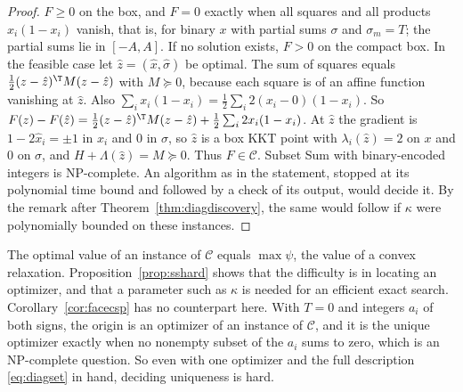 \begin{proof}
$F\ge0$ on the box, and $F=0$ exactly when all squares and all products
$x_i(1-x_i)$ vanish, that is, for binary $x$ with partial sums $\sigma$ and
$\sigma_m=T$; the partial sums lie in $[-A,A]$. If no solution exists, $F>0$
on the compact box. In the feasible case let $\hat z=(\hat x,\hat\sigma)$ be
optimal. The sum of
squares equals $\frac12(z-\hat z)^{\T}M(z-\hat z)$ with $M\succeq0$,
because each square is of an affine function vanishing at $\hat z$. Also
$\sum_ix_i(1-x_i)=\frac12\sum_i2(x_i-0)(1-x_i)$. So
$F(z)-F(\hat z)=\frac12(z-\hat z)^{\T}M(z-\hat z)+\frac12\sum_i2x_i(1-x_i)$.
At $\hat z$ the gradient is $1-2\hat x_i=\pm1$ in $x_i$ and $0$ in
$\sigma$, so $\hat z$ is a box KKT point with $\lambda_i(\hat z)=2$ on $x$ and
$0$ on $\sigma$, and $H+\Lambda(\hat z)=M\succeq0$. Thus $F\in\mathcal C$.
Subset Sum with binary-encoded integers is NP-complete. An algorithm as in the
statement, stopped at its polynomial time bound and followed by a check of its
output, would decide it. By the remark after Theorem~\ref{thm:diagdiscovery},
the same would follow if $\kappa$ were polynomially bounded on these instances.
\end{proof}

The optimal value of an instance of $\mathcal C$ equals $\max\psi$, the value
of a convex relaxation. Proposition~\ref{prop:sshard} shows that the
difficulty is in locating an optimizer, and that a parameter such as $\kappa$
is needed for an efficient exact search. Corollary~\ref{cor:facecsp} has no
counterpart here. With $T=0$ and integers $a_i$ of both signs, the origin is an
optimizer of an instance of $\mathcal C$, and it is the unique optimizer
exactly when no nonempty subset of the $a_i$ sums to zero, which is an
NP-complete question. So even with one optimizer and the full description
\eqref{eq:diagset} in hand, deciding uniqueness is hard.

